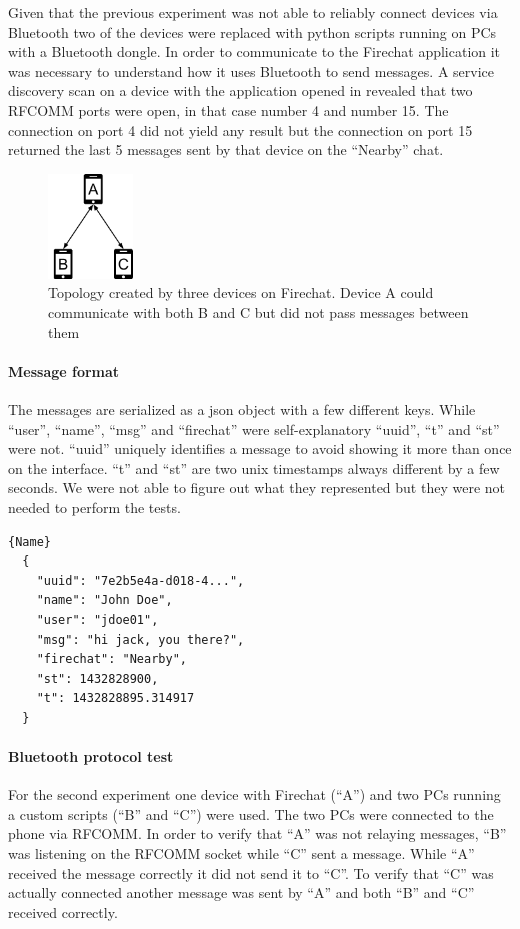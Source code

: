 Given that the previous experiment was not able to reliably connect devices via Bluetooth two of the devices were replaced with python scripts running on PCs with a Bluetooth dongle.
In order to communicate to the Firechat application it was necessary to understand how it uses Bluetooth to send messages.
A service discovery scan on a device with the application opened in revealed that two RFCOMM ports were open, in that case number 4 and number 15.
The connection on port 4 did not yield any result but the connection on port 15 returned the last 5 messages sent by that device on the ``Nearby'' chat.

\begin{figure}[ht!]
  \centering
  \includegraphics[width=0.2\textwidth]{img/diagram1.png} 
  \caption{Topology created by three devices on Firechat. Device A could communicate with both B and C but did not pass messages between them}
\end{figure}

\paragraph{Message format}
The messages are serialized as a json object with a few different keys.
While ``user'', ``name'', ``msg'' and ``firechat'' were self-explanatory ``uuid'', ``t'' and ``st'' were not.
``uuid'' uniquely identifies a message to avoid showing it more than once on the interface.
``t'' and ``st'' are two unix timestamps always different by a few seconds.
We were not able to figure out what they represented but they were not needed to perform the tests. 


\begin{minipage}{\textwidth}
  \begin{lstlisting}[caption=Sample Firechat application message,frame=tlrb]{Name}
  {
    "uuid": "7e2b5e4a-d018-4...",
    "name": "John Doe",
    "user": "jdoe01",
    "msg": "hi jack, you there?",
    "firechat": "Nearby",
    "st": 1432828900,
    "t": 1432828895.314917
  }
\end{lstlisting}
\end{minipage}

\paragraph{Bluetooth protocol test}
For the second experiment one device with Firechat (``A'') and two PCs running a custom scripts (``B'' and ``C'') were used. The two PCs were connected to the phone via RFCOMM. In order to verify that ``A'' was not relaying messages, ``B'' was listening on the RFCOMM socket while ``C'' sent a message. While ``A'' received the message correctly it did not send it to ``C''. To verify that ``C'' was actually connected another message was sent by ``A'' and both ``B'' and ``C'' received correctly.


